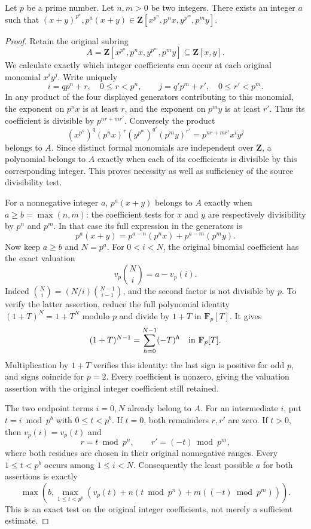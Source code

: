 \begin{lemma}
\label{lemma-help-with-powers}
Let $p$ be a prime number. Let $n, m > 0$ be two integers. There exists
an integer $a$ such that
$(x + y)^{p^a}, p^a(x + y) \in \mathbf{Z}[x^{p^n}, p^nx, y^{p^m}, p^my]$.
\end{lemma}

\begin{proof}
Retain the original subring
$$
A=\mathbf Z[x^{p^n},p^n x,y^{p^m},p^m y]
\subseteq\mathbf Z[x,y].
$$
We calculate exactly which integer
coefficients can occur at each original
monomial $x^i y^j$. Write uniquely
$$
i=q p^n+r,\quad 0\leq r<p^n,
\qquad j=q' p^m+r',\quad 0\leq r'<p^m.
$$
In any product of the four displayed
generators contributing to this
monomial, the exponent on $p^n x$
is at least $r$, and the exponent
on $p^m y$ is at least $r'$.
Thus its coefficient is divisible
by $p^{nr+mr'}$. Conversely the
product
$$
(x^{p^n})^q(p^n x)^r
(y^{p^m})^{q'}(p^m y)^{r'}
=p^{nr+mr'}x^i y^j
$$
belongs to $A$. Since distinct formal
monomials are independent over
$\mathbf Z$, a polynomial belongs
to $A$ exactly when each of its
coefficients is divisible by this
corresponding integer. This proves
necessity as well as sufficiency
of the source divisibility test.

For a nonnegative integer $a$,
$p^a(x+y)$ belongs to $A$ exactly
when $a\geq b=\max(n,m)$: the
coefficient tests for $x$ and $y$
are respectively divisibility by
$p^n$ and $p^m$. In that case its
full expression in the generators is
$$
p^a(x+y)=p^{a-n}(p^n x)+p^{a-m}(p^m y).
$$
Now keep $a\geq b$ and $N=p^a$.
For $0<i<N$, the original binomial
coefficient has the exact valuation
$$
v_p\binom Ni=a-v_p(i).
$$
Indeed
$\binom Ni=(N/i)\binom{N-1}{i-1}$,
and the second factor is not divisible
by $p$. To verify the latter assertion,
reduce the full polynomial identity
$(1+T)^N=1+T^N$ modulo $p$ and divide
by $1+T$ in $\mathbf F_p[T]$.
It gives
$$
(1+T)^{N-1}=\sum_{h=0}^{N-1}(-T)^h
\quad\hbox{in }\mathbf F_p[T].
$$
Multiplication by $1+T$ verifies this
identity: the last sign is positive
for odd $p$, and signs coincide for
$p=2$. Every coefficient is nonzero,
giving the valuation assertion with
the original integer coefficient
still retained.

The two endpoint terms $i=0,N$
already belong to $A$. For an
intermediate $i$, put $t=i\bmod p^b$
with $0\leq t<p^b$. If $t=0$, both
remainders $r,r'$ are zero. If $t>0$,
then $v_p(i)=v_p(t)$ and
$$
r=t\bmod p^n,\qquad
r'=(-t)\bmod p^m,
$$
where both residues are chosen in
their original nonnegative ranges.
Every $1\leq t<p^b$ occurs among
$1\leq i<N$. Consequently the least
possible $a$ for both assertions
is exactly
$$
\max\left(b,
\max_{1\leq t<p^b}
\left(v_p(t)+n(t\bmod p^n)+m((-t)\bmod p^m)\right)\right).
$$
This is an exact test on the
original integer coefficients,
not merely a sufficient estimate.


\end{proof}
